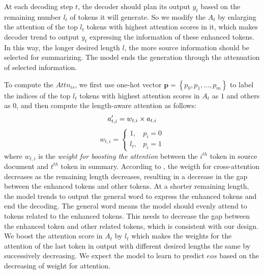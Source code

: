 At each decoding step $t$, the decoder should plan its output $y_t$ based on the remaining number $l_t$ of tokens it will generate.
So we modify the $A_t$ by enlarging the attention of the top $l_t$ tokens with highest attention scores in it,
which makes decoder trend to output $y_t$ expressing the information of these enhanced tokens. 
In this way, the longer desired length $l$, the more source information should be selected for summarizing. 
The model ends the generation through the attenuation of selected information. 

To compute the $Attn_{is}$, we first use one-hot vector $\mathbf{p}=\left\{p_0,p_1,...,p_m\right\}$ to label the indices of the top $l_t$ tokens with highest attention scores in $A_t$ as $1$ and others as $0$, and then compute the length-aware attention as follows:
 \begin{equation}
 	a'_{t,i}=w_{t,i} \times a_{t,i} \\
\end{equation}
\begin{equation}\label{eq:w}
 	w_{t,i}=
 	\begin{cases}			
 		1, &\mbox{$p_i=0$}\\			
 		l_t, &\mbox{$p_i=1$}			
 	\end{cases}	
 \end{equation}
where $w_{t,i}$ is the {\em weight for boosting the attention} between the $i^{th}$ token in source document and $t^{th}$ token in summary.
According to ,  
the weigth for cross-attention decreases as the remaining length decreases,
resulting in a decrease in the gap between the enhanced tokens and other tokens. 
At a shorter remaining length, 
the model trends to output the general word to 
express the enhanced tokens and end the decoding.
The general word means the model should evenly attend to
tokens related to the enhanced tokens.
This needs to decrease the gap between the enhanced token and other related tokens,
which is consistent with our design.
We boost the attention score in $A_t$ by $l_t$
which makes the weights for the attention of the last token in output with different desired lengths the same by successively decreasing.
We expect the model to learn to predict $eos$ based on the decreasing of weight for attention.

